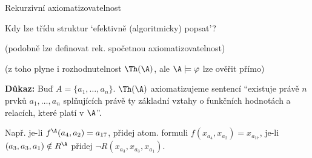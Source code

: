 \documentclass{beamer}
\begin{document}
\begin{frame}{Rekurzivní axiomatizovatelnost}

    Kdy lze třídu struktur `efektivně (algoritmicky) popsat'?


    (podobně lze definovat \alert{rek. spočetnou axiomatizovatelnost})

        
    (z toho plyne i rozhodnutelnost $\Th(\A)$, ale $\A\models\varphi$ lze ověřit přímo)

    \textbf{Důkaz:}
    Buď $A=\{a_1,\dots,a_n\}$. $\Th(\A)$ axiomatizujeme sentencí ``existuje právě $n$ prvků $a_1,\dots,a_n$ splňujících právě ty \alert{základní vztahy} o funkčních hodnotách a relacích, které platí v $\A$''.
    
    Např. je-li $f^\A(a_4, a_2)=a_{17}$, přidej atom. formuli $f(x_{a_4},x_{a_2})=x_{a_{17}}$, je-li $(a_3,a_3,a_1)\notin R^\A$ přidej $\neg R(x_{a_3},x_{a_3},x_{a_1})$.\hfill\qedsymbol

\end{frame}
\end{document}
